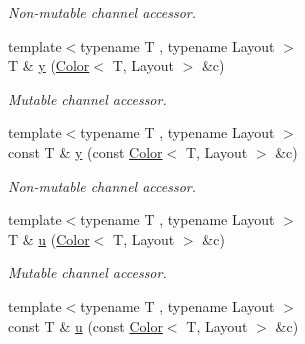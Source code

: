 \begin{DoxyCompactItemize}
\begin{DoxyCompactList}\small\item\em Non-\/mutable channel accessor. \end{DoxyCompactList}\item 
\hypertarget{group___channel_accessors_gac90c52c5b3a7b2a7e3761e6e84f25778}{{\footnotesize template$<$typename T , typename Layout $>$ }\\T \& \hyperlink{group___channel_accessors_gac90c52c5b3a7b2a7e3761e6e84f25778}{y} (\hyperlink{class_d_o_1_1_color}{Color}$<$ T, Layout $>$ \&c)}\label{group___channel_accessors_gac90c52c5b3a7b2a7e3761e6e84f25778}

\begin{DoxyCompactList}\small\item\em Mutable channel accessor. \end{DoxyCompactList}\item 
\hypertarget{group___channel_accessors_ga42846abfe3173fb8a817a0e3a3fa9c44}{{\footnotesize template$<$typename T , typename Layout $>$ }\\const T \& \hyperlink{group___channel_accessors_ga42846abfe3173fb8a817a0e3a3fa9c44}{y} (const \hyperlink{class_d_o_1_1_color}{Color}$<$ T, Layout $>$ \&c)}\label{group___channel_accessors_ga42846abfe3173fb8a817a0e3a3fa9c44}

\begin{DoxyCompactList}\small\item\em Non-\/mutable channel accessor. \end{DoxyCompactList}\item 
\hypertarget{group___channel_accessors_ga056f2dcf2b4d1976e50bf20547617584}{{\footnotesize template$<$typename T , typename Layout $>$ }\\T \& \hyperlink{group___channel_accessors_ga056f2dcf2b4d1976e50bf20547617584}{u} (\hyperlink{class_d_o_1_1_color}{Color}$<$ T, Layout $>$ \&c)}\label{group___channel_accessors_ga056f2dcf2b4d1976e50bf20547617584}

\begin{DoxyCompactList}\small\item\em Mutable channel accessor. \end{DoxyCompactList}\item 
\hypertarget{group___channel_accessors_gae90bfcd1e7783b7306b5d1df688f3671}{{\footnotesize template$<$typename T , typename Layout $>$ }\\const T \& \hyperlink{group___channel_accessors_gae90bfcd1e7783b7306b5d1df688f3671}{u} (const \hyperlink{class_d_o_1_1_color}{Color}$<$ T, Layout $>$ \&c)}\label{group___channel_accessors_gae90bfcd1e7783b7306b5d1df688f3671}


\end{DoxyCompactItemize}
